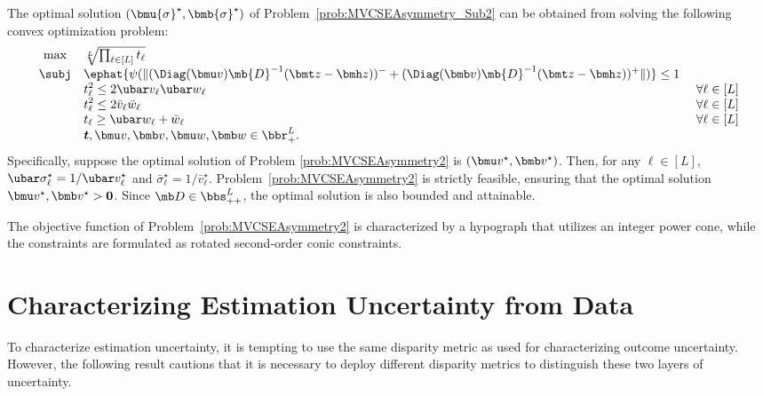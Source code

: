 \documentclass[opre, blindrev]{informs4}
\newcommand{\1}[1]{\mathds{1}{\left(#1\right)}}
\begin{document}
\begin{theorem}\label{thm:MVCSEAsymmetry_reformulation}
The optimal solution $(\bmu{\sigma}^\star, \bmb{\sigma}^\star)$ of Problem~\eqref{prob:MVCSEAsymmetry_Sub2} can be obtained from solving the following convex optimization problem:
\begin{equation}
\label{prob:MVCSEAsymmetry2}
\begin{array}{cll}
\max & \sqrt[L]{\prod_{\ell \in [L]} t_\ell}  \\
\subj & \displaystyle\ephat{\psi(\|(\Diag(\bmu v)\mb{D}^{-1}(\bmt z - \bmh z))^- + (\Diag(\bmb v)\mb{D}^{-1}(\bmt z - \bmh z ))^+\|)} \leq 1 \\
& \displaystyle t_{\ell}^2 \leq 2 \ubar v_{\ell} \ubar w_{\ell} &~\forall \ell \in [L]\\
& \displaystyle t_{\ell}^2 \leq 2 \bar v_{\ell} \bar w_{\ell} &~\forall \ell \in [L]\\
& \displaystyle t_{\ell} \geq \ubar w_{\ell} + \bar w_{\ell} &~\forall \ell \in [L]\\
&\bm t, \bmu v, \bmb v, \bmu w, \bmb w \in \bbr^L_{+}.  
\end{array} 
\end{equation}
Specifically, suppose the optimal solution of Problem \eqref{prob:MVCSEAsymmetry2} is $(\bmu v^\star, \bmb v^\star)$. Then, for any $\ell \in [L]$, $\ubar \sigma_{\ell}^\star = 1/\ubar v_{\ell}^\star$ and $\bar \sigma_{\ell}^\star = 1/\bar v_{\ell}^\star$. Problem~\eqref{prob:MVCSEAsymmetry2} is strictly feasible, ensuring that the optimal solution $\bmu v^\star, \bmb v^\star > \bm 0$. Since $\mb D\in \bbs^{L}_{++}$, the optimal solution is also bounded and attainable. 
\end{theorem}

The objective function of Problem~\eqref{prob:MVCSEAsymmetry2} is characterized by a hypograph that utilizes an integer power cone, while the constraints are formulated as rotated second-order conic constraints. 

\section{Characterizing Estimation Uncertainty from Data} \label{sec:EstimatioUncertaintyData}

To characterize estimation uncertainty, it is tempting to use the same disparity metric as used for characterizing outcome uncertainty. However, the following result cautions that it is necessary to deploy different disparity metrics to distinguish these two layers of uncertainty.  
\end{document}

